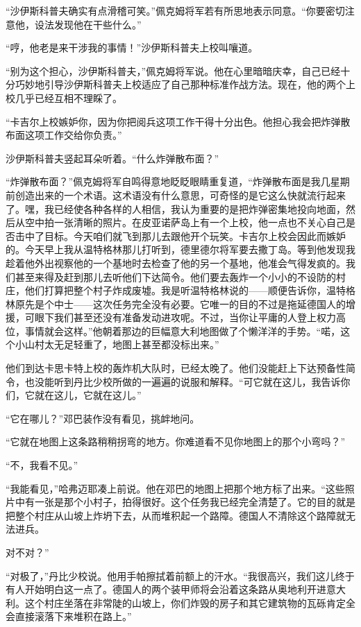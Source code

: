     “沙伊斯科普夫确实有点滑稽可笑。”佩克姆将军若有所思地表示同意。“你要密切注意他，设法发现他在干些什么。”

    “哼，他老是来干涉我的事情！”沙伊斯科普夫上校叫嚷道。

    “别为这个担心，沙伊斯科普夫，”佩克姆将军说。他在心里暗暗庆幸，自己已经十分巧妙地引导沙伊斯科普夫上校适应了自己那种标准作战方法。现在，他的两个上校几乎已经互相不理睬了。

    “卡吉尔上校嫉妒你，因为你把阅兵这项工作干得十分出色。他担心我会把炸弹散布面这项工作交给你负责。”

    沙伊斯科普夫竖起耳朵听着。“什么炸弹散布面？”

    “炸弹散布面？”佩克姆将军自鸣得意地眨眨眼睛重复道，“炸弹散布面是我几星期前创造出来的一个术语。这术语没有什么意思，可奇怪的是它这么快就流行起来了。嘿，我已经使各种各样的人相信，我认为重要的是把炸弹密集地投向地面，然后从空中拍一张清晰的照片。在皮亚诺萨岛上有一个上校，他一点也不关心自己是否击中了目标。今天咱们就飞到那儿去跟他开个玩笑。卡吉尔上校会因此而嫉妒的。今天早上我从温特格林那儿打听到，德里德尔将军要去撒丁岛。等到他发现我趁着他外出视察他的一个基地时去检查了他的另一个基地，他准会气得发疯的。我们甚至来得及赶到那儿去听他们下达简令。他们要去轰炸一个小小的不设防的村庄，他们打算把整个村子炸成废墟。我是听温特格林说的——顺便告诉你，温特格林原先是个中士——这次任务完全没有必要。它唯一的目的不过是拖延德国人的增援，可眼下我们甚至还没有准备发动进攻呢。不过，当你让平庸的人登上权力高位，事情就会这样。”他朝着那边的巨幅意大利地图做了个懒洋洋的手势。“喏，这个小山村太无足轻重了，地图上甚至都没标出来。”

    他们到达卡思卡特上校的轰炸机大队时，已经太晚了。他们没能赶上下达预备性简令，也没能听到丹比少校所做的一遍遍的说服和解释。“可它就在这儿，我告诉你们，它就在这儿，它就在这儿。”

    “它在哪儿？”邓巴装作没有看见，挑衅地问。

    “它就在地图上这条路稍稍拐弯的地方。你难道看不见你地图上的那个小弯吗？”

    “不，我看不见。”

    “我能看见，”哈弗迈耶凑上前说。他在邓巴的地图上把那个地方标了出来。“这些照片中有一张是那个小村子，拍得很好。这个任务我已经完全清楚了。它的目的就是把整个村庄从山坡上炸坍下去，从而堆积起一个路障。德国人不清除这个路障就无法进兵。

    对不对？”

    “对极了，”丹比少校说。他用手帕擦拭着前额上的汗水。“我很高兴，我们这儿终于有人开始明白这一点了。德国人的两个装甲师将会沿着这条路从奥地利开进意大利。这个村庄坐落在非常陡的山坡上，你们炸毁的房子和其它建筑物的瓦砾肯定全会直接滚落下来堆积在路上。”


